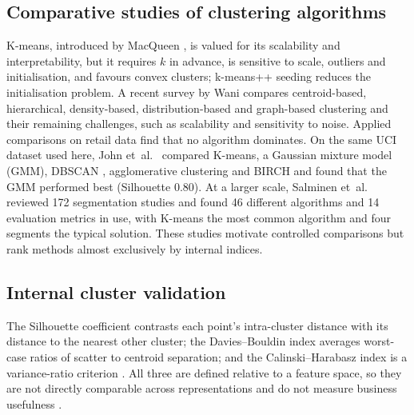 \documentclass[conference,10pt]{IEEEtran}
\begin{document}
\subsection{Comparative studies of clustering algorithms}
K-means, introduced by MacQueen \cite{macqueen1967some}, is valued for its
scalability and interpretability, but it requires $k$ in advance, is
sensitive to scale, outliers and initialisation, and favours convex
clusters; k-means++ seeding \cite{arthur2007kmeanspp} reduces the
initialisation problem. A recent survey by Wani \cite{wani2024comprehensive}
compares centroid-based, hierarchical, density-based, distribution-based and
graph-based clustering and their remaining challenges, such as scalability
and sensitivity to noise. Applied comparisons on retail data find that no
algorithm dominates. On the same UCI dataset used here, John et~al.\
\cite{john2023exploration} compared K-means, a Gaussian mixture model (GMM),
DBSCAN \cite{ester1996dbscan}, agglomerative clustering and BIRCH and found
that the GMM performed best (Silhouette 0.80). At a larger scale, Salminen
et~al.\ \cite{salminen2023algorithms} reviewed 172 segmentation studies and
found 46 different algorithms and 14 evaluation metrics in use, with K-means
the most common algorithm and four segments the typical solution. These
studies motivate controlled comparisons but rank methods
almost exclusively by internal indices.

\subsection{Internal cluster validation}
The Silhouette coefficient \cite{rousseeuw1987silhouettes} contrasts each
point's intra-cluster distance with its distance to the nearest other
cluster; the Davies--Bouldin index averages worst-case ratios of scatter
to centroid separation; and the Calinski--Harabasz index is a
variance-ratio criterion \cite{ikotun2025cluster}. All three are defined relative to a feature space, so they are not
directly comparable across representations and do not measure business
usefulness \cite{salminen2023algorithms}.
\end{document}
